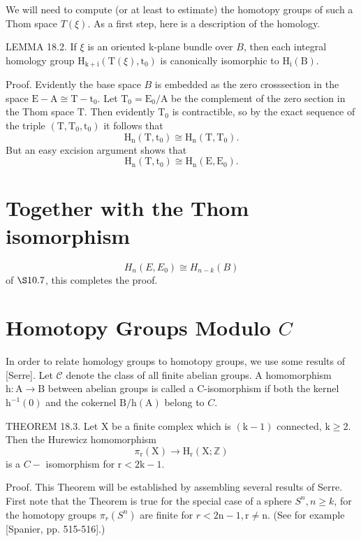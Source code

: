 \documentclass[10pt]{article}
\begin{document}
We will need to compute (or at least to estimate) the homotopy groups of such a Thom space $T(\xi)$. As a first step, here is a description of the homology.

LEMMA 18.2. If $\xi$ is an oriented k-plane bundle over $B$, then each integral homology group $\mathrm{H}_{\mathrm{k}+\mathrm{i}}\left(\mathrm{T}(\xi), \mathrm{t}_{0}\right)$ is canonically isomorphic to $\mathrm{H}_{\mathrm{i}}(\mathrm{B})$.

Proof. Evidently the base space $B$ is embedded as the zero crosssection in the space $\mathrm{E}-\mathrm{A} \cong \mathrm{T}-\mathrm{t}_{0}$. Let $\mathrm{T}_{0}=\mathrm{E}_{0} / \mathrm{A}$ be the complement of the zero section in the Thom space $\mathrm{T}$. Then evidently $\mathrm{T}_{0}$ is contractible, so by the exact sequence of the triple $\left(\mathrm{T}, \mathrm{T}_{0}, \mathrm{t}_{0}\right)$ it follows that
$$
\mathrm{H}_{\mathrm{n}}\left(\mathrm{T}, \mathrm{t}_{0}\right) \cong \mathrm{H}_{\mathrm{n}}\left(\mathrm{T}, \mathrm{T}_{0}\right) .
$$
But an easy excision argument shows that
$$
\mathrm{H}_{\mathrm{n}}\left(\mathrm{T}, \mathrm{t}_{0}\right) \cong \mathrm{H}_{\mathrm{n}}\left(\mathrm{E}, \mathrm{E}_{0}\right) .
$$

\section{Together with the Thom isomorphism}
$$
H_{n}\left(E, E_{0}\right) \cong H_{n-k}(B)
$$
of $\S 10.7$, this completes the proof.

\section{Homotopy Groups Modulo $C$}
In order to relate homology groups to homotopy groups, we use some results of [Serre]. Let $\mathcal{C}$ denote the class of all finite abelian groups. A homomorphism $\mathrm{h}: \mathrm{A} \rightarrow \mathrm{B}$ between abelian groups is called a C-isomorphism if both the kernel $\mathrm{h}^{-1}(0)$ and the cokernel $\mathrm{B} / \mathrm{h}(\mathrm{A})$ belong to $C$.

THEOREM 18.3. Let $\mathrm{X}$ be a finite complex which is $(\mathrm{k}-1)$ connected, $\mathrm{k} \geq 2$. Then the Hurewicz homomorphism
$$
\pi_{\mathrm{r}}(\mathrm{X}) \rightarrow \mathrm{H}_{\mathrm{r}}(\mathrm{X} ; \mathbb{Z})
$$
is a $C-$ isomorphism for $\mathrm{r}<2 \mathrm{k}-1$.

Proof. This Theorem will be established by assembling several results of Serre. First note that the Theorem is true for the special case of a sphere $S^{n}, n \geq k$, for the homotopy groups $\pi_{r}\left(S^{n}\right)$ are finite for $r<2 \mathrm{n}-1, \mathrm{r} \neq \mathrm{n}$. (See for example [Spanier, pp. 515-516].)
\end{document}
